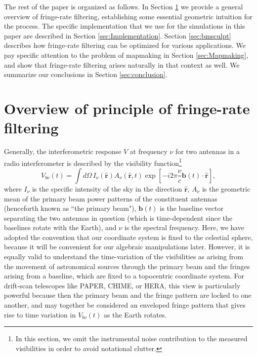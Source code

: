 \documentclass[twocolumn,apj,numberedappendix]{emulateapj}
\newcommand{\rhat}{\hat{\mathbf{r}}}
\begin{document}
The rest of the paper is organized as follows. In Section \ref{sec:overview} we provide a general
overview of fringe-rate filtering, establishing some essential geometric intuition for the process. The
specific implementation that we use for the simulations in this paper are described in Section
\ref{sec:Implementation}. Section \ref{sec:bmsculpt} describes how fringe-rate filtering can be
optimized for various applications. We pay specific attention to the problem of mapmaking in
Section \ref{sec:Mapmaking}, and show that fringe-rate filtering arises naturally in that context as well.
We summarize our conclusions in Section \ref{sec:conclusion}.


\section{Overview of principle of fringe-rate filtering}
\label{sec:overview}
Generally, the interferometric response $V$ at frequency $\nu$ for two antennas in a radio interferometer is described
by the visibility function\footnote{In this section, we omit the instrumental noise contribution to the measured visibilities in order to avoid notational clutter.}
\begin{equation}
\label{eq:originalVis}
V_{b\nu}(t)=\int d\Omega \, {I_\nu(\rhat) A_\nu(\rhat,t) \exp \left[-i2\pi \frac{\nu}{c}  \mathbf{b}(t) \cdot \rhat\right]},
\end{equation}
where $I_\nu$ is the specific intensity of the sky in the direction $\rhat$,
$A_\nu$ is the geometric mean of the primary beam power patterns of the constituent antennas (henceforth known as ``the primary beam"), $\mathbf{ b}(t)$ is the baseline vector separating the two antennas in question (which is time-dependent since the baselines rotate with the Earth), and $\nu$ is the spectral
frequency.
Here, we have adopted the convention that our coordinate system is fixed to the celestial sphere, because it will be convenient for our algebraic manipulations later. However, it is equally valid to understand the time-variation of the visibilities as arising from the movement of astronomical sources through the primary beam and the fringes arising from a baseline, which are fixed to a topocentric coordinate system. For drift-scan telescopes like PAPER, CHIME, or HERA, this view is particularly powerful because then the primary beam and the fringe pattern are locked to one another, and may together be considered an enveloped fringe pattern that gives rise
to time variation in $V_{b\nu}(t)$ as the Earth rotates.
\end{document}
